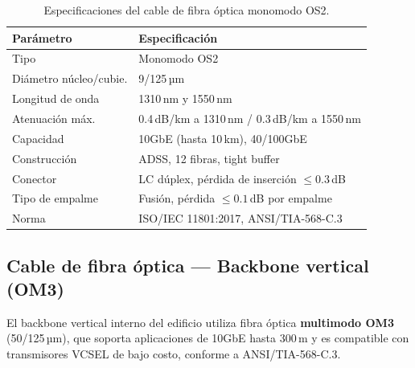 \begin{table}[H]
    \centering
    \caption{Especificaciones del cable de fibra óptica monomodo OS2.}
    \label{tab:fo_os2}
    \begin{tabular}{|p{5cm}|p{8.5cm}|}
        \hline
        \textbf{Parámetro} & \textbf{Especificación} \\
        \hline
        Tipo                  & Monomodo OS2 \\
        \hline
        Diámetro núcleo/cubie.& 9/125\,µm \\
        \hline
        Longitud de onda      & 1310\,nm y 1550\,nm \\
        \hline
        Atenuación máx.\      & 0.4\,dB/km a 1310\,nm / 0.3\,dB/km a 1550\,nm \\
        \hline
        Capacidad             & 10GbE (hasta 10\,km), 40/100GbE \\
        \hline
        Construcción          & ADSS, 12 fibras, tight buffer \\
        \hline
        Conector              & LC dúplex, pérdida de inserción $\leq 0.3$\,dB \\
        \hline
        Tipo de empalme       & Fusión, pérdida $\leq 0.1$\,dB por empalme \\
        \hline
        Norma                 & ISO/IEC 11801:2017, ANSI/TIA-568-C.3 \\
        \hline
    \end{tabular}
\end{table}%
\nobreak\vspace{-0.3cm}
\subsection{Cable de fibra óptica — Backbone vertical (OM3)}

El backbone vertical interno del edificio utiliza fibra óptica
\textbf{multimodo OM3} (50/125\,µm), que soporta aplicaciones de 10GbE
hasta 300\,m y es compatible con transmisores VCSEL de bajo costo, conforme
a \mbox{ANSI/TIA-568-C.3}.

